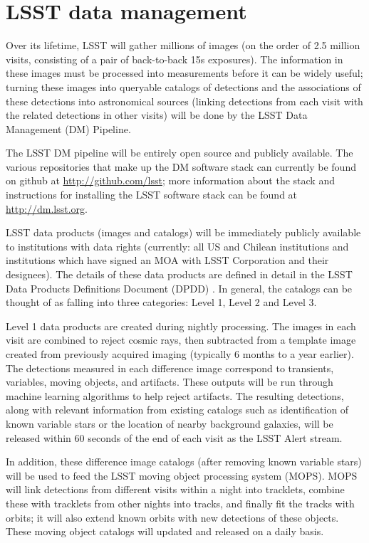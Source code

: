 \documentclass{iau}
\begin{document}
\section{LSST data management}

Over its lifetime, LSST will gather millions of images (on the order
of 2.5 million visits, consisting of a pair of back-to-back 15s
exposures). The information in these images must be processed into
measurements before it can be widely useful; turning these images into
queryable catalogs of detections and the associations of these
detections into astronomical sources (linking detections from each
visit with the related detections in other visits) will be done by the
LSST Data Management (DM) Pipeline.

The LSST DM pipeline will be entirely open source and publicly
available. The various repositories that make up the DM software stack
can currently be found on github at \url{http://github.com/lsst};
more information about the stack and instructions for installing the
LSST software stack can be found at \url{http://dm.lsst.org}.

LSST data products (images and catalogs) will be immediately publicly available to
institutions with data rights (currently: all US and Chilean
institutions and institutions which have signed an MOA with LSST
Corporation and their designees).  The details of these data products
are defined in detail in the LSST Data Products Definitions Document (DPDD)
\cite{LSST_DPDD}. In general, the catalogs can be
thought of as falling into three categories: Level 1, Level 2 and
Level 3.

Level 1 data products are created during nightly processing. The
images in each visit are combined to reject cosmic rays, then
subtracted from a template image created from previously acquired
imaging (typically 6 months to a year earlier). The detections
measured in each difference image correspond to transients, variables,
moving objects, and artifacts. These outputs will be run through
machine learning algorithms to help reject artifacts. The resulting
detections, along with relevant information from existing catalogs
such as identification of known variable stars or the location of
nearby background galaxies, will be released within 60 seconds of the
end of each visit as the LSST Alert stream.

In addition, these difference image catalogs (after removing known
variable stars) will be used to feed the LSST moving object processing
system (MOPS). MOPS will link detections from different visits within
a night into tracklets, combine these with tracklets from
other nights into tracks, and finally fit the tracks with orbits; it will also extend
known orbits with new detections of these objects. These moving object
catalogs will updated and released on a daily basis.
\end{document}
